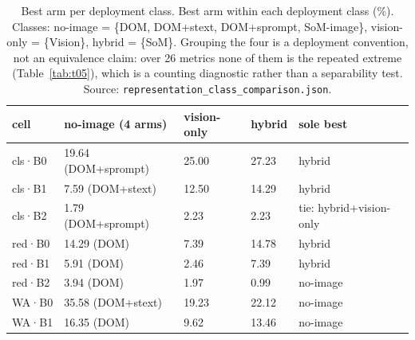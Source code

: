 \begin{table}[tp]
\centering
\caption{Best arm per deployment class. Best arm within each deployment class (\%). Classes: no-image = \{DOM, DOM+stext, DOM+sprompt, SoM-image\}, vision-only = \{Vision\}, hybrid = \{SoM\}. Grouping the four is a deployment convention, not an equivalence claim: over 26 metrics none of them is the repeated extreme (Table~\ref{tab:t05}), which is a counting diagnostic rather than a separability test. Source: \texttt{representation\_class\_comparison.json}.}
\label{tab:t02}
\footnotesize
\setlength{\tabcolsep}{3pt}
\begin{tabular}{@{}lllll@{}}
\toprule
cell & no-image (4 arms) & vision-only & hybrid & sole best \\
\midrule
cls·B0 & 19.64 (DOM+\allowbreak{}sprompt) & 25.00 & 27.23 & hybrid \\
cls·B1 & 7.59 (DOM+\allowbreak{}stext) & 12.50 & 14.29 & hybrid \\
cls·B2 & 1.79 (DOM+\allowbreak{}sprompt) & 2.23 & 2.23 & tie: hybrid+vision-only \\
red·B0 & 14.29 (DOM) & 7.39 & 14.78 & hybrid \\
red·B1 & 5.91 (DOM) & 2.46 & 7.39 & hybrid \\
red·B2 & 3.94 (DOM) & 1.97 & 0.99 & no-image \\
WA·B0 & 35.58 (DOM+\allowbreak{}stext) & 19.23 & 22.12 & no-image \\
WA·B1 & 16.35 (DOM) & 9.62 & 13.46 & no-image \\
\bottomrule
\end{tabular}
\end{table}
